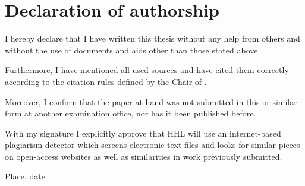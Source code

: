 \chapter*{Declaration of authorship}

I hereby declare that I have written this thesis without any help from others and without the use of documents and aids other than those stated above.

Furthermore, I have mentioned all used sources and have cited them correctly according to the citation rules defined by the Chair of \dcchair.

Moreover, I confirm that the paper at hand was not submitted in this or similar form at another examination office, nor has it been published before.

With my signature I explicitly approve that HHL will use an internet-based plagiarism detector which screens electronic text files and looks for similar pieces on open-access websites as well as similarities in work previously submitted.

Place, date